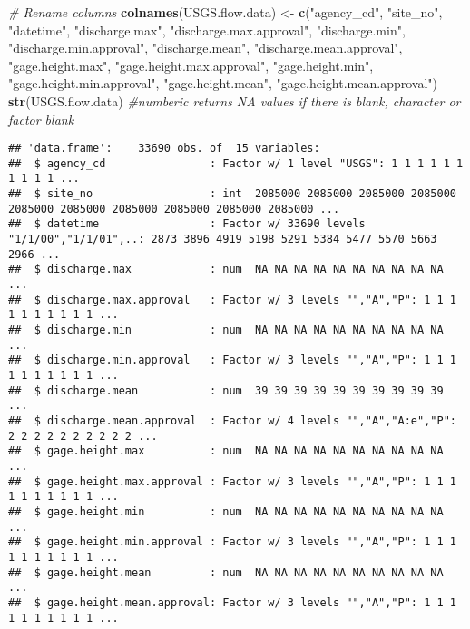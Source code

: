\documentclass[]{article}
\newenvironment{Shaded}{\begin{snugshade}}{\end{snugshade}}
\newcommand{\CommentTok}[1]{\textcolor[rgb]{0.56,0.35,0.01}{\textit{#1}}}
\newcommand{\KeywordTok}[1]{\textcolor[rgb]{0.13,0.29,0.53}{\textbf{#1}}}
\newcommand{\NormalTok}[1]{#1}
\newcommand{\StringTok}[1]{\textcolor[rgb]{0.31,0.60,0.02}{#1}}
\begin{document}
\begin{Shaded}
\begin{Highlighting}[]
\CommentTok{# Rename columns}
\KeywordTok{colnames}\NormalTok{(USGS.flow.data) <-}\StringTok{ }\KeywordTok{c}\NormalTok{(}\StringTok{"agency_cd"}\NormalTok{, }\StringTok{"site_no"}\NormalTok{, }\StringTok{"datetime"}\NormalTok{, }
                              \StringTok{"discharge.max"}\NormalTok{, }\StringTok{"discharge.max.approval"}\NormalTok{, }
                              \StringTok{"discharge.min"}\NormalTok{, }\StringTok{"discharge.min.approval"}\NormalTok{, }
                              \StringTok{"discharge.mean"}\NormalTok{, }\StringTok{"discharge.mean.approval"}\NormalTok{, }
                              \StringTok{"gage.height.max"}\NormalTok{, }\StringTok{"gage.height.max.approval"}\NormalTok{, }
                              \StringTok{"gage.height.min"}\NormalTok{, }\StringTok{"gage.height.min.approval"}\NormalTok{, }
                              \StringTok{"gage.height.mean"}\NormalTok{, }\StringTok{"gage.height.mean.approval"}\NormalTok{)}
\KeywordTok{str}\NormalTok{(USGS.flow.data) }\CommentTok{#numberic returns NA values if there is blank, character or factor blank}
\end{Highlighting}
\end{Shaded}

\begin{verbatim}
## 'data.frame':    33690 obs. of  15 variables:
##  $ agency_cd                : Factor w/ 1 level "USGS": 1 1 1 1 1 1 1 1 1 1 ...
##  $ site_no                  : int  2085000 2085000 2085000 2085000 2085000 2085000 2085000 2085000 2085000 2085000 ...
##  $ datetime                 : Factor w/ 33690 levels "1/1/00","1/1/01",..: 2873 3896 4919 5198 5291 5384 5477 5570 5663 2966 ...
##  $ discharge.max            : num  NA NA NA NA NA NA NA NA NA NA ...
##  $ discharge.max.approval   : Factor w/ 3 levels "","A","P": 1 1 1 1 1 1 1 1 1 1 ...
##  $ discharge.min            : num  NA NA NA NA NA NA NA NA NA NA ...
##  $ discharge.min.approval   : Factor w/ 3 levels "","A","P": 1 1 1 1 1 1 1 1 1 1 ...
##  $ discharge.mean           : num  39 39 39 39 39 39 39 39 39 39 ...
##  $ discharge.mean.approval  : Factor w/ 4 levels "","A","A:e","P": 2 2 2 2 2 2 2 2 2 2 ...
##  $ gage.height.max          : num  NA NA NA NA NA NA NA NA NA NA ...
##  $ gage.height.max.approval : Factor w/ 3 levels "","A","P": 1 1 1 1 1 1 1 1 1 1 ...
##  $ gage.height.min          : num  NA NA NA NA NA NA NA NA NA NA ...
##  $ gage.height.min.approval : Factor w/ 3 levels "","A","P": 1 1 1 1 1 1 1 1 1 1 ...
##  $ gage.height.mean         : num  NA NA NA NA NA NA NA NA NA NA ...
##  $ gage.height.mean.approval: Factor w/ 3 levels "","A","P": 1 1 1 1 1 1 1 1 1 1 ...
\end{verbatim}
\end{document}
